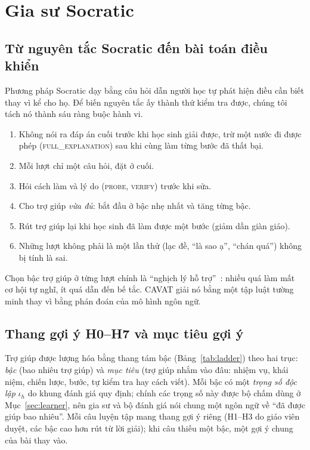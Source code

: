\section{Gia sư Socratic}\label{sec:socratic}

\subsection{Từ nguyên tắc Socratic đến bài toán điều khiển}
Phương pháp Socratic dạy bằng câu hỏi dẫn người học tự phát hiện điều cần biết thay vì kể cho họ. Để biến nguyên tắc ấy thành thứ kiểm tra được, chúng tôi tách nó thành sáu ràng buộc hành vi.
\begin{enumerate}[label=(\alph*)]
  \item Không nói ra đáp án cuối trước khi học sinh giải được, trừ một nước đi được phép (\textsc{full\_explanation}) sau khi cùng làm từng bước đã thất bại.
  \item Mỗi lượt chỉ một câu hỏi, đặt ở cuối.
  \item Hỏi cách làm và lý do (\textsc{probe}, \textsc{verify}) trước khi sửa.
  \item Cho trợ giúp \emph{vừa đủ}: bắt đầu ở bậc nhẹ nhất và tăng từng bậc.
  \item Rút trợ giúp lại khi học sinh đã làm được một bước (giảm dần giàn giáo).
  \item Những lượt không phải là một lần thử (lạc đề, ``là sao ạ'', ``chán quá'') không bị tính là sai.
\end{enumerate}
Chọn bậc trợ giúp ở từng lượt chính là ``nghịch lý hỗ trợ''~\cite{koedinger2007}: nhiều quá làm mất cơ hội tự nghĩ, ít quá dẫn đến bế tắc. CAVAT giải nó bằng một tập luật tường minh thay vì bằng phán đoán của mô hình ngôn ngữ.

\subsection{Thang gợi ý H0--H7 và mục tiêu gợi ý}
Trợ giúp được lượng hóa bằng thang tám bậc (Bảng~\ref{tab:ladder}) theo hai trục: \emph{bậc} (bao nhiêu trợ giúp) và \emph{mục tiêu} (trợ giúp nhắm vào đâu: nhiệm vụ, khái niệm, chiến lược, bước, tự kiểm tra hay cách viết). Mỗi bậc có một \emph{trọng số độc lập} $\iota_h$ do khung đánh giá quy định; chính các trọng số này được bộ chấm dùng ở Mục~\ref{sec:learner}, nên gia sư và bộ đánh giá nói chung một ngôn ngữ về ``đã được giúp bao nhiêu''. Mỗi câu luyện tập mang thang gợi ý riêng (H1--H3 do giáo viên duyệt, các bậc cao hơn rút từ lời giải); khi câu thiếu một bậc, một gợi ý chung của bài thay vào.

